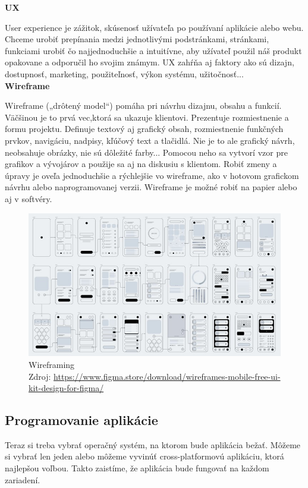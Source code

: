 \documentclass[10pt,twoside,slovak,a4paper]{article}
\begin{document}
\textbf{UX}

\quad User experience je zážitok, skúsenosť užívateľa po používaní aplikácie alebo webu. Chceme urobiť prepínania medzi jednotlivými podstránkami, stránkami, funkciami urobiť čo najjednoduchšie a intuitívne, aby užívateľ použil náš produkt opakovane a odporučil ho svojim známym. UX zahŕňa aj faktory ako sú dizajn, dostupnosť, marketing, použiteľnosť, výkon systému, užitočnosť...
\cite{touch4it, openxcell}
\\	%


\textbf{Wireframe}

\quad Wireframe („drôtený model“) pomáha pri návrhu dizajnu, obsahu a funkcií. Väčšinou je to prvá vec,ktorá sa ukazuje klientovi. Prezentuje rozmiestnenie a formu projektu. Definuje textový aj grafický obsah, rozmiestnenie funkčných prvkov, navigáciu, nadpisy, kľúčový text a tlačidlá. Nie je to ale grafický návrh, neobsahuje obrázky, nie sú dôležité farby... Pomocou neho sa vytvorí vzor pre grafikov a vývojárov a použije sa aj na diskusiu s klientom. Robiť zmeny a úpravy je oveľa jednoduchšie a rýchlejšie vo wireframe, ako v hotovom grafickom návrhu alebo naprogramovanej verzii. Wireframe je možné robiť na papier alebo aj v softvéry.
\cite{buildfire, wiki2}

\begin{figure}[h!]
\includegraphics[scale=0.6]{wireframing2}
\centering
\caption{Wireframing
\\ Zdroj: \url{https://www.figma.store/download/wireframes-mobile-free-ui-kit-design-for-figma/}}
\end{figure}


\subsection{Programovanie aplikácie}
\quad Teraz si treba vybrať operačný systém, na ktorom bude aplikácia bežať. Môžeme si vybrať len jeden alebo môžeme vyvinúť cross-platformovú aplikáciu, ktorá najlepšou voľbou. Takto zaistíme, že aplikácia bude fungovať na každom zariadení.
\cite{buildfire}
\end{document}
